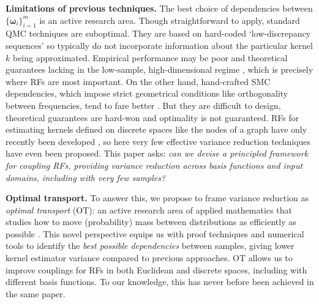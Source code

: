 \documentclass{article}
\newcommand{\pg}[1]{{\bf #1.}}
\begin{document}
\pg{Limitations of previous techniques} The best choice of dependencies between $\{\boldsymbol{\omega}_i\}_{i=1}^m$ is an active research area. 
Though straightforward to apply, standard QMC techniques are suboptimal. 
They are based on hard-coded `low-discrepancy sequences' so typically do not incorporate information about the particular kernel $k$ being approximated. 
Empirical performance may be poor and theoretical guarantees lacking in the low-sample, high-dimensional regime \citep{rowland2018geometrically, morokoff1995quasi}, which is precisely where RFs are most important. 
On the other hand, hand-crafted SMC dependencies, which impose strict geometrical conditions like orthogonality between frequencies, tend to fare better \citep{yu2016orthogonal}. 
But they are difficult to design, theoretical guarantees are hard-won and optimality is not guaranteed.
RFs for estimating kernels defined on discrete spaces like the nodes of a graph have only recently been developed \citep{graph_features, tripp2024tanimoto}, so here very few effective variance reduction techniques have even been proposed.
This paper asks: \emph{can we devise a principled framework for coupling RFs, providing variance reduction  across basis functions and input domains, including with very few samples?}

\pg{Optimal transport}
To answer this, we propose to frame variance reduction as \emph{optimal transport} (OT): an active research area of applied mathematics that studies how to move (probability) mass between distributions as efficiently as possible \citep{villani2009optimal}. 
This novel perspective equips us with proof techniques and numerical tools to identify the \emph{best possible dependencies} between samples, giving lower kernel estimator variance compared to previous approaches.
OT allows us to improve couplings for RFs in both Euclidean and discrete spaces, including with different basis functions. 
To our knowledge, this has never before been achieved in the same paper.
\end{document}
